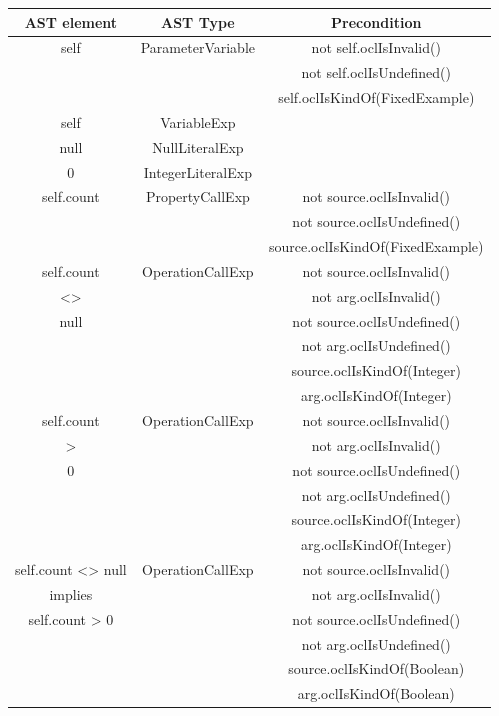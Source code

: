 \documentclass[
]{ceurart}
\begin{document}
\begin{center}
	\begin{tabular}{|c|c||c|}
		\hline
		AST element & AST Type & Precondition \\
		\hline
		\hline
		self & ParameterVariable & not self.oclIsInvalid() \\
		&& not self.oclIsUndefined() \\
		&& self.oclIsKindOf(FixedExample) \\
 		\hline
		self & VariableExp & \\
 		\hline
		null & NullLiteralExp & \\
 		\hline
		0 & IntegerLiteralExp & \\
		\hline
		self.count & PropertyCallExp & not source.oclIsInvalid() \\
		&& not source.oclIsUndefined() \\
		&& source.oclIsKindOf(FixedExample) \\
 		\hline
		self.count & OperationCallExp & not source.oclIsInvalid() \\
		<> && not arg.oclIsInvalid() \\
		null && not source.oclIsUndefined() \\
		&& not arg.oclIsUndefined() \\
		&& source.oclIsKindOf(Integer) \\
		&& arg.oclIsKindOf(Integer) \\
 		\hline
        self.count & OperationCallExp & not source.oclIsInvalid() \\
		> && not arg.oclIsInvalid() \\
		0 && not source.oclIsUndefined() \\
		&& not arg.oclIsUndefined() \\
		&& source.oclIsKindOf(Integer) \\
		&& arg.oclIsKindOf(Integer) \\
 		\hline
        self.count <> null & OperationCallExp & not source.oclIsInvalid() \\
		implies && not arg.oclIsInvalid() \\
		self.count > 0 && not source.oclIsUndefined() \\
		&& not arg.oclIsUndefined() \\
		&& source.oclIsKindOf(Boolean) \\
		&& arg.oclIsKindOf(Boolean) \\
		\hline
	\end{tabular}
\end{center}
\end{document}
